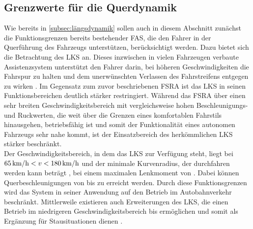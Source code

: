 \subsection{Grenzwerte für die Querdynamik} \label{subsec:querdynamik}
Wie bereits in \ref{subsec:längsdynamik} sollen auch in diesem Abschnitt zunächst die Funktionsgrenzen bereits bestehender \gls{FAS}, die den Fahrer in der Querführung des Fahrzeugs unterstützen, berücksichtigt werden. Dazu bietet sich die Betrachtung des \gls{LKS} an. Dieses inzwischen in vielen Fahrzeugen verbaute Assistenzsystem unterstützt den Fahrer darin, bei höheren Geschwindigkeiten die Fahrspur zu halten und dem unerwünschten Verlassen des Fahrstreifens entgegen zu wirken \cite{gayko}. Im Gegensatz zum zuvor beschriebenen \gls{FSRA} ist das \gls{LKS} in seinen Funktionsbereichen deutlich stärker restringiert. Während das \gls{FSRA} über einen sehr breiten Geschwindigkeitsbereich mit vergleichsweise hohen Beschleunigungs- und Ruckwerten, die weit über die Grenzen eines komfortablen Fahrstils hinausgehen, betriebsfähig ist und somit der Funktionalität eines autonomen Fahrzeugs sehr nahe kommt, ist der Einsatzbereich des herkömmlichen \gls{LKS} stärker beschränkt. \\
Der Geschwindigkeitsbereich, in dem das \gls{LKS} zur Verfügung steht, liegt bei $65\,\mathrm{km/h}<v<180\,\mathrm{km/h}$ und der minimale Kurvenradius, der durchfahren werden kann beträgt , bei einem maximalen Lenkmoment von  \cite{gayko}. Dabei können Querbeschleunigungen von bis zu  erreicht werden. Durch diese Funktionsgrenzen wird das System in seiner Anwendung auf den Betrieb im Autobahnverkehr beschränkt. Mittlerweile existieren auch Erweiterungen des \gls{LKS}, die einen Betrieb im niedrigeren Geschwindigkeitsbereich bis  ermöglichen und somit als Ergänzung für Stausituationen dienen \cite{oschlies}.

